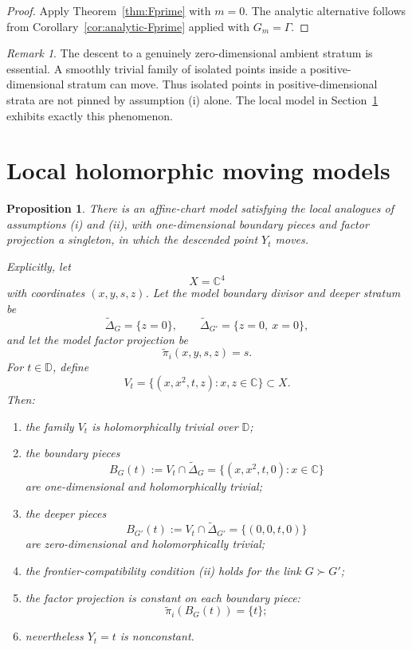 \documentclass[12pt]{article}
\theoremstyle{plain}
\newtheorem{proposition}[theorem]{Proposition}
\theoremstyle{definition}
\theoremstyle{remark}
\newtheorem{remark}[theorem]{Remark}
\newcommand{\D}{\mathbb D}
\newcommand{\C}{\mathbb C}
\begin{document}
\begin{proof}
Apply Theorem~\ref{thm:Fprime} with \(m=0\).  The analytic alternative follows from Corollary~\ref{cor:analytic-Fprime} applied with \(G_m=\Gamma\).
\end{proof}

\begin{remark}
The descent to a genuinely zero-dimensional ambient stratum is essential.  A smoothly trivial family of isolated points inside a positive-dimensional stratum can move.  Thus isolated points in positive-dimensional strata are not pinned by assumption (i) alone.  The local model in Section~\ref{sec:local-models} exhibits exactly this phenomenon.
\end{remark}

\section{Local holomorphic moving models}\label{sec:local-models}

\begin{proposition}\label{prop:local-model}
There is an affine-chart model satisfying the local analogues of assumptions (i) and (ii), with one-dimensional boundary pieces and factor projection a singleton, in which the descended point \(Y_t\) moves.

Explicitly, let
\[
X=\C^4
\]
with coordinates \((x,y,s,z)\).  Let the model boundary divisor and deeper stratum be
\[
\widetilde\Delta_G=\{z=0\},\qquad
\widetilde\Delta_{G'}=\{z=0,\ x=0\},
\]
and let the model factor projection be
\[
\widetilde\pi_i(x,y,s,z)=s.
\]
For \(t\in\D\), define
\[
V_t=\{(x,x^2,t,z):x,z\in\C\}\subset X.
\]
Then:

\begin{enumerate}[label=(\alph*)]
  \item the family \(V_t\) is holomorphically trivial over \(\D\);
  \item the boundary pieces
  \[
  B_G(t):=V_t\cap \widetilde\Delta_G
  =
  \{(x,x^2,t,0):x\in\C\}
  \]
  are one-dimensional and holomorphically trivial;
  \item the deeper pieces
  \[
  B_{G'}(t):=V_t\cap \widetilde\Delta_{G'}
  =
  \{(0,0,t,0)\}
  \]
  are zero-dimensional and holomorphically trivial;
  \item the frontier-compatibility condition (ii) holds for the link \(G\succ G'\);
  \item the factor projection is constant on each boundary piece:
  \[
  \widetilde\pi_i(B_G(t))=\{t\};
  \]
  \item nevertheless \(Y_t=t\) is nonconstant.
\end{enumerate}
\end{proposition}
\end{document}
